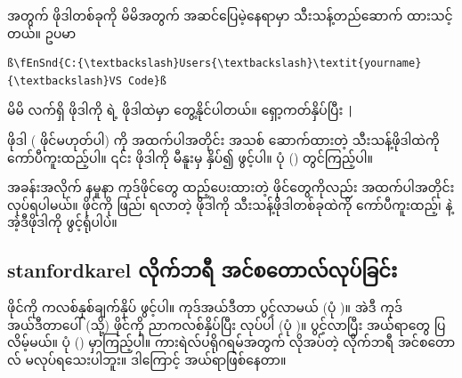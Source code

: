  အတွက် ဖိုဒါတစ်ခုကို မိမိအတွက် အဆင်ပြေမဲ့နေရာမှာ သီးသန့်တည်ဆောက် ထားသင့်တယ်။ ဥပမာ 
%
\begin{verbatim}
ß\fEnSnd{C:{\textbackslash}Users{\textbackslash}\textit{yourname}{\textbackslash}VS Code}ß
\end{verbatim}
%
\begin{mytcbox}
မိမိ လက်ရှိ  ဖိုဒါကို    ရဲ့   ဖိုဒါထဲမှာ တွေ့နိုင်ပါတယ်။  ရှော့ကတ်နှိပ်ပြီး \texttt|%
\end{mytcbox}

 ဖိုဒါ ( ဖိုင်မဟုတ်ပါ) ကို အထက်ပါအတိုင်း အသစ် ဆောက်ထားတဲ့  သီးသန့်ဖိုဒါထဲကို ကော်ပီကူးထည့်ပါ။ ၎င်း  ဖိုဒါကို   မီနူးမှ  နှိပ်၍ ဖွင့်ပါ။ ပုံ (\fRefNo{\ref{fig:opnmtkrl}}) တွင်ကြည့်ပါ။

အခန်းအလိုက် နမူနာ ကုဒ်ဖိုင်တွေ ထည့်ပေးထားတဲ့  ဖိုင်တွေကိုလည်း အထက်ပါအတိုင်း လုပ်ရပါမယ်။  ဖိုင်ကို ဖြည်၊ ရလာတဲ့ ဖိုဒါကို သီးသန့်ဖိုဒါတစ်ခုထဲကို ကော်ပီကူးထည့်၊  နဲ့ အဲ့ဒီဖိုဒါကို ဖွင့်ရုံပါပဲ။



\clearpage
\subsection*{stanfordkarel လိုက်ဘရီ အင်စတောလ်လုပ်ခြင်း}
 ဖိုင်ကို ကလစ်နှစ်ချက်နှိပ် ဖွင့်ပါ။ ကုဒ်အယ်ဒီတာ ပွင့်လာမယ် (ပုံ \fRefNo{\ref{fig:edtmtkrl}})။ အဲဒီ ကုဒ်အယ်ဒီတာပေါ် (သို့)  ဖိုင်ကို ညာကလစ်နှိပ်ပြီး  လုပ်ပါ (ပုံ \fRefNo{\ref{fig:runmtkrl2}})။  ပွင့်လာပြီး အယ်ရာတွေ ပြလိမ့်မယ်။ ပုံ (\fRefNo{\ref{fig:mtkrlfstrun}}) မှာကြည့်ပါ။ ကားရဲလ်ပရိုဂရမ်အတွက် လိုအပ်တဲ့  လိုက်ဘရီ အင်စတောလ် မလုပ်ရသေးပါဘူး။ ဒါကြောင့် အယ်ရာဖြစ်နေတာ။

